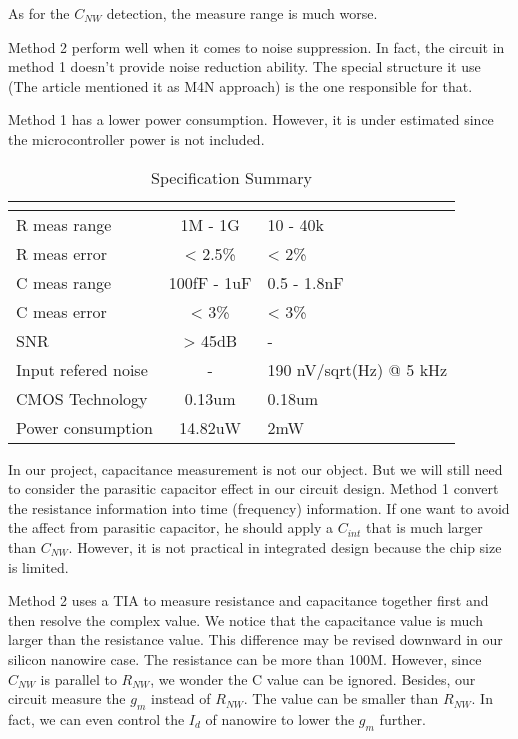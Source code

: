 As for the $C_{NW}$ detection,
the measure range is much worse.{\color{red}{Reason}}

Method 2 perform well when it comes to noise suppression.
In fact, the circuit in method 1 doesn't provide noise reduction ability.
The special structure it use (The article \cite{Juv1} mentioned it as M4N approach) is the one responsible for that.

Method 1 has a lower power consumption. However, it is under estimated since the microcontroller power is not included.

\begin{table}[!htb]
    {\fontfamily{}\fontsize{10}{14}\selectfont
    \centering
    \label{tb:LVtable}
    \begin{tabular}{l|cp{4cm}}
        & \cite{Juv2} & \cite{Jlockin}\\
        \hline
        R meas range & 1M - 1G & 10 - 40k\\
        \hline
        R meas error & < 2.5\% & < 2\%\\
        \hline
        C meas range & 100fF - 1uF & 0.5 - 1.8nF\\
        \hline
        C meas error & < 3\% & < 3\%\\
        \hline
        SNR & > 45dB & - \\
        \hline
        Input refered noise & - & 190 nV/sqrt(Hz) @ 5 kHz \\
        \hline
        CMOS Technology & 0.13um & 0.18um\\
        \hline
        Power consumption & 14.82uW & 2mW\\
    \end{tabular}
    \caption{Specification Summary}
    }
\end{table}

In our project, capacitance measurement is not our object.
But we will still need to consider the parasitic capacitor effect in our circuit design.
Method 1 convert the resistance information into time (frequency) information.
If one want to avoid the affect from parasitic capacitor, he should apply a $C_{int}$ that is much larger than $C_{NW}$.
However, it is not practical in integrated design because the chip size is limited.

Method 2 uses a TIA to measure resistance and capacitance together first and then resolve the complex value.
We notice that the capacitance value is much larger than the resistance value.
This difference may be revised downward in our silicon nanowire case.
The resistance can be more than 100M.
However, since $C_{NW}$ is parallel to $R_{NW}$, we wonder the C value can be ignored.
Besides, our circuit measure the $g_m$ instead of $R_{NW}$.
The value can be smaller than $R_{NW}$.
In fact, we can even control the $I_d$ of nanowire to lower the $g_m$ further.

